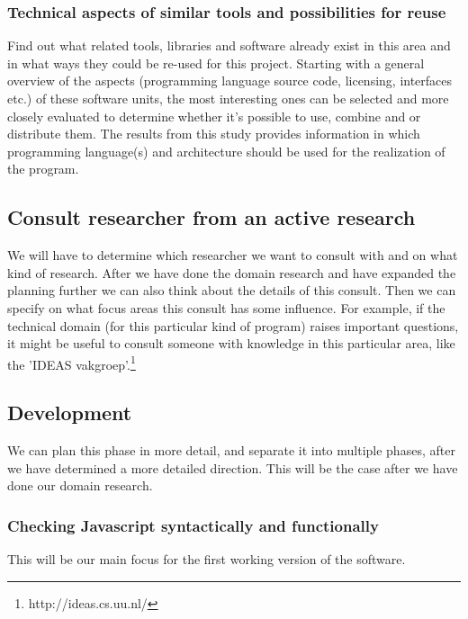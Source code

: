 \documentclass{article}
\begin{document}
\subsubsection{Technical aspects of similar tools and possibilities for reuse}
Find out what related tools, libraries and software already exist in this area and in what ways they could be re-used for this project. Starting with a general overview of the aspects (programming language source code, licensing, interfaces etc.) of these software units, the most interesting ones can be selected and more closely evaluated to determine whether it's possible to use, combine and or distribute them. The results from this study provides information in which programming language(s) and architecture should be used for the realization of the program.

\subsection{Consult researcher from an active research}
We will have to determine which researcher we want to consult with and on what kind of research. After we have done the domain research and have expanded the planning further we can also think about the details of this consult. Then we can specify on what focus areas this consult has some influence. For example, if the technical domain (for this particular kind of program) raises important questions, it might be useful to consult someone with knowledge in this particular area, like the 'IDEAS vakgroep'.\footnote{http://ideas.cs.uu.nl/}\\

\subsection{Development}
We can plan this phase in more detail, and separate it into multiple phases, after we have determined a more detailed direction. This will be the case after we have done our domain research.

\subsubsection{Checking Javascript syntactically and functionally}
This will be our main focus for the first working version of the software.
\end{document}
